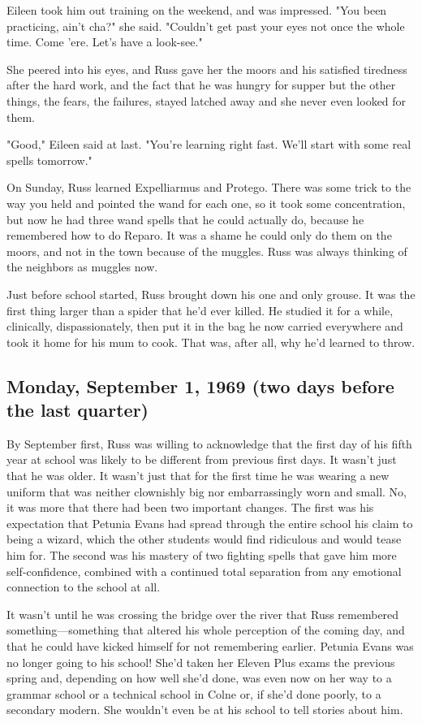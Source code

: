 Eileen took him out training on the weekend, and was impressed. "You been practicing, ain't cha?" she said. "Couldn't get past your eyes not once the whole time. Come 'ere. Let's have a look-see."

She peered into his eyes, and Russ gave her the moors and his satisfied tiredness after the hard work, and the fact that he was hungry for supper{\el} but the other things, the fears, the failures, stayed latched away and she never even looked for them.

"Good," Eileen said at last. "You're learning right fast. We'll start with some real spells tomorrow."

On Sunday, Russ learned Expelliarmus and Protego. There was some trick to the way you held and pointed the wand for each one, so it took some concentration, but now he had three wand spells that he could actually do, because he remembered how to do Reparo. It was a shame he could only do them on the moors, and not in the town because of the muggles. Russ was always thinking of the neighbors as muggles now.

Just before school started, Russ brought down his one and only grouse. It was the first thing larger than a spider that he'd ever killed. He studied it for a while, clinically, dispassionately, then put it in the bag he now carried everywhere and took it home for his mum to cook. That was, after all, why he'd learned to throw.

\subsection{Monday, September 1, 1969 (two days before the last quarter)}

By September first, Russ was willing to acknowledge that the first day of his fifth year at school was likely to be different from previous first days. It wasn't just that he was older. It wasn't just that for the first time he was wearing a new uniform that was neither clownishly big nor embarrassingly worn and small. No, it was more that there had been two important changes. The first was his expectation that Petunia Evans had spread through the entire school his claim to being a wizard, which the other students would find ridiculous and would tease him for. The second was his mastery of two fighting spells that gave him more self-confidence, combined with a continued total separation from any emotional connection to the school at all.

It wasn't until he was crossing the bridge over the river that Russ remembered something—something that altered his whole perception of the coming day, and that he could have kicked himself for not remembering earlier. Petunia Evans was no longer going to his school! She'd taken her Eleven Plus exams the previous spring and, depending on how well she'd done, was even now on her way to a grammar school or a technical school in Colne or, if she'd done poorly, to a secondary modern. She wouldn't even be at his school to tell stories about him.

